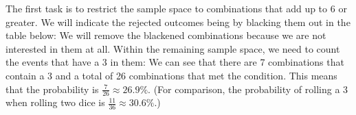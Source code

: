 \documentclass[table]{ximera}
\begin{document}
The first task is to restrict the sample space to combinations that add up to 6 or greater. We will indicate the rejected outcomes being by blacking them out in the table below:
We will remove the blackened combinations because we are not interested in them at all. Within the remaining sample space, we need to count the events that have a 3 in them:
We can see that there are 7 combinations that contain a 3 and a total of 26 combinations that met the condition. This means that the probability is $\frac{7}{26} \approx 26.9\%$. (For comparison, the probability of rolling a 3 when rolling two dice is $\frac{11}{36} \approx 30.6\%$.)
\end{document}
